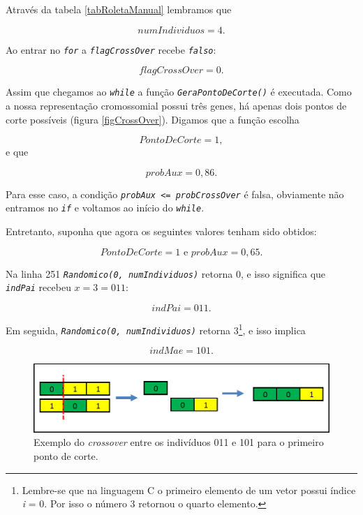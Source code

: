 	Através da tabela \ref{tabRoletaManual} lembramos que 
	
	$$
		numIndividuos = 4.
	$$
	
	Ao entrar no \textit{\texttt{for}} a \textit{\texttt{flagCrossOver}} recebe \textit{\texttt{falso}}:
	
	$$
		flagCrossOver = 0.
	$$

	Assim que chegamos ao \textit{\texttt{while}} a função \textit{\texttt{GeraPontoDeCorte()}} é executada. Como a nossa representação cromossomial possui três genes, há apenas dois pontos de corte possíveis (figura \ref{figCrossOver}). Digamos que a função escolha
	
	$$
		PontoDeCorte = 1,
	$$
	e que
	
	$$
		probAux = 0,86.
	$$
	
	Para esse caso, a condição \textit{\texttt{probAux <= probCrossOver}} é falsa, obviamente não entramos no \textit{\texttt{if}} e voltamos ao início do \textit{\texttt{while}}.
	
	Entretanto, suponha que agora os seguintes valores tenham sido obtidos:
	
	$$
		PontoDeCorte = 1 \mbox{  e  } probAux = 0,65.
	$$
	
	Na linha 251 \textit{\texttt{Randomico(0, numIndividuos)}} retorna 0, e isso significa que \textit{\texttt{indPai}} recebeu $x = 3 = 011$:
	
	$$
		indPai = 011.
	$$
	
	Em seguida, \textit{\texttt{Randomico(0, numIndividuos)}} retorna 3\footnote{Lembre-se que na linguagem C o primeiro elemento de um vetor possui índice \textit{i} = 0. Por isso o número 3 retornou o quarto elemento.}, e isso implica
	
	$$
		indMae = 101.
	$$
	
	\begin{figure}[htp]
		\begin{center}
			\includegraphics[width=13cm]{figs/ga/exemplo_crossover.png}
		\end{center}
		\caption{\label{figExemploCrossOver} Exemplo do \textit{crossover} entre os indivíduos 011 e 101 para o primeiro ponto de corte.}
	\end{figure}
	
